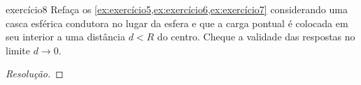 \begin{exercício}{}{exercício8}
    Refaça os \cref{ex:exercício5,ex:exercício6,ex:exercício7} considerando uma casca esférica condutora no lugar da esfera e que a carga pontual é colocada em seu interior a uma distância \(d < R\) do centro. Cheque a validade das respostas no limite \(d \to 0\).
\end{exercício}
\begin{proof}[Resolução]

\end{proof}
